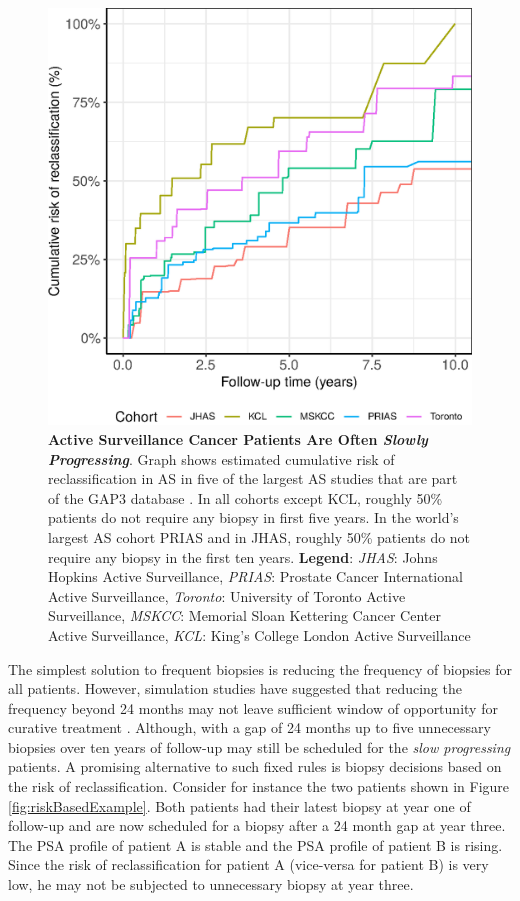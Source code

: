 \begin{figure}[!htb]
\centerline{\includegraphics[width=\columnwidth]{images/npmle_plot.eps}}
\caption{\textbf{Active Surveillance Cancer Patients Are Often \textit{Slowly Progressing}}. Graph shows estimated cumulative risk of reclassification\citep{bul2013active} in AS in five of the largest AS studies that are part of the GAP3 database \citep{gap3_2018}. In all cohorts except KCL, roughly 50\% patients do not require any biopsy in first five years. In the world's largest AS cohort PRIAS and in JHAS, roughly 50\% patients do not require any biopsy in the first ten years. \textbf{Legend}: \textit{JHAS}: Johns Hopkins Active Surveillance, \textit{PRIAS}: Prostate Cancer International Active Surveillance, \textit{Toronto}: University of Toronto Active Surveillance, \textit{MSKCC}: Memorial Sloan Kettering Cancer Center Active Surveillance, \textit{KCL}: King's College London Active Surveillance}
\label{fig:npmle_plot}
\end{figure}

The simplest solution to frequent biopsies is reducing the frequency of biopsies for all patients. However, simulation studies have suggested that reducing the frequency beyond 24 months may not leave sufficient window of opportunity for curative treatment \citep{inoue2018comparative}. Although, with a gap of 24 months up to five unnecessary biopsies over ten years of follow-up may still be scheduled for the \textit{slow progressing} patients. A promising alternative to such fixed rules is biopsy decisions based on the risk of reclassification. Consider for instance the two patients shown in Figure \ref{fig:riskBasedExample}. Both patients had their latest biopsy at year one of follow-up and are now scheduled for a biopsy after a 24 month gap at year three. The PSA profile of patient A is stable and the PSA profile of patient B is rising. Since the risk of reclassification for patient A (vice-versa for patient B) is very low, he may not be subjected to unnecessary biopsy at year three.

